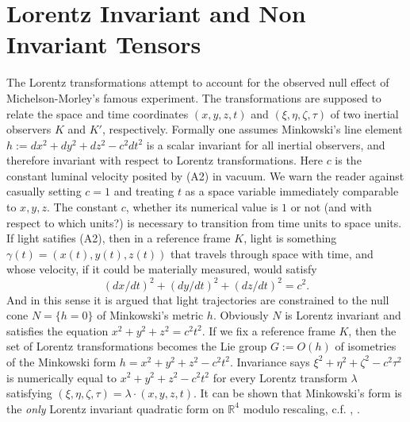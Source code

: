 \documentclass[12pt]{amsart}
\theoremstyle{definition}
\theoremstyle{remark}
\newcommand{\bR}{\mathbb{R}}
\begin{document}
\section{Lorentz Invariant and Non Invariant Tensors}\label{li}

The Lorentz transformations attempt to account for the observed null effect of Michelson-Morley's famous experiment. The transformations are supposed to relate the space and time coordinates $(x,y,z,t)$ and $(\xi, \eta, \zeta, \tau)$ of two inertial observers $K$ and $K'$, respectively. Formally one assumes Minkowski's line element $h:=dx^2+dy^2+dz^2-c^2dt^2$ is a scalar invariant for all inertial observers, and therefore invariant with respect to Lorentz transformations. Here $c$ is the constant luminal velocity posited by (A2) in vacuum. We warn the reader against casually setting $c=1$ and treating $t$ as a space variable immediately comparable to $x,y,z$. The constant $c$, whether its numerical value is $1$ or not (and with respect to which units?) is necessary to transition from time units to space units. If light satifies (A2), then in a reference frame $K$, light is something $\gamma(t)=(x(t),y(t),z(t))$ that travels through space with time, and whose velocity, if it could be materially measured, would satisfy $$(dx/dt)^2+(dy/dt)^2+(dz/dt)^2=c^2.$$ And in this sense it is argued that light trajectories are constrained to the null cone $N=\{h=0\}$ of Minkowski's metric $h$. Obviously $N$ is Lorentz invariant and satisfies the equation $x^2+y^2+z^2=c^2 t^2$. If we fix a reference frame $K$, then the set of Lorentz transformations becomes the Lie group $G:=O(h)$ of isometries of the Minkowski form $h=x^2+y^2+z^2-c^2t^2$. Invariance says $\xi^2+\eta^2+\zeta^2-c^2 \tau^2$ is numerically equal to $x^2+y^2+z^2-c^2 t^2$ for every Lorentz transform $\lambda$ satisfying $(\xi, \eta, \zeta, \tau)=\lambda \cdot (x,y,z,t)$.  It can be shown that Minkowski's form is the \emph{only} Lorentz invariant quadratic form on $\bR^4$ modulo rescaling, c.f. \cite{elton2010indefinite}, \cite{arminjon2018lorentz}.



\end{document}

